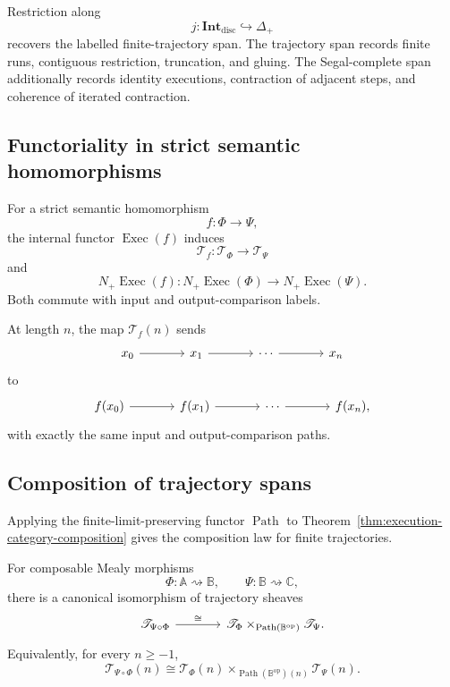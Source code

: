 Restriction along
\[
    j:\mathbf{Int}_{\mathrm{disc}}\hookrightarrow\Delta_+
\]
recovers the labelled finite-trajectory span. The trajectory span records
finite runs, contiguous restriction, truncation, and gluing. The
Segal-complete span additionally records identity executions, contraction of
adjacent steps, and coherence of iterated contraction.

\subsection{Functoriality in strict semantic homomorphisms}
\label{subsec:trajectory-functoriality-strict}

For a strict semantic homomorphism
\[
    f:\Phi\to\Psi,
\]
the internal functor \(\operatorname{Exec}(f)\) induces
\[
    \mathscr T_f:
    \mathscr T_\Phi\to\mathscr T_\Psi
\]
and
\[
    N_+\operatorname{Exec}(f):
    N_+\operatorname{Exec}(\Phi)
    \to
    N_+\operatorname{Exec}(\Psi).
\]
Both commute with input and output-comparison labels.

At length \(n\), the map \(\mathscr T_f(n)\) sends
\[
\begin{tikzcd}[column sep=large]
    x_0
        \arrow[r]
    &
    x_1
        \arrow[r]
    &
    \cdots
        \arrow[r]
    &
    x_n
\end{tikzcd}
\]
to
\[
\begin{tikzcd}[column sep=large]
    f(x_0)
        \arrow[r]
    &
    f(x_1)
        \arrow[r]
    &
    \cdots
        \arrow[r]
    &
    f(x_n),
\end{tikzcd}
\]
with exactly the same input and output-comparison paths.

\subsection{Composition of trajectory spans}
\label{subsec:temporal-composition}

Applying the finite-limit-preserving functor \(\operatorname{Path}\) to
Theorem~\ref{thm:execution-category-composition} gives the composition law for
finite trajectories.

\begin{theorem}
\label{thm:temporal-composition}
For composable Mealy morphisms
\[
    \Phi:\mathbb A\rightsquigarrow\mathbb B,
    \qquad
    \Psi:\mathbb B\rightsquigarrow\mathbb C,
\]
there is a canonical isomorphism of trajectory sheaves
\[
\begin{tikzcd}[column sep=large]
    \mathscr T_{\Psi\circ\Phi}
        \arrow[r, "\cong"]
    &
    \mathscr T_\Phi
        \times_{\operatorname{Path}(\mathbb B^{\mathrm{op}})}
    \mathscr T_\Psi.
\end{tikzcd}
\]
Equivalently, for every \(n\geq-1\),
\[
    \mathscr T_{\Psi\circ\Phi}(n)
    \cong
    \mathscr T_\Phi(n)
    \times_{\operatorname{Path}(\mathbb B^{\mathrm{op}})(n)}
    \mathscr T_\Psi(n).
\]
\end{theorem}

